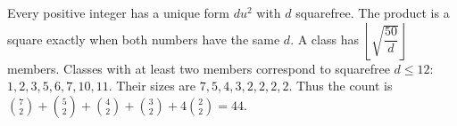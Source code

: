 Every positive integer has a unique form $du^2$ with $d$ squarefree. The product is a square exactly when both numbers have the same $d$. A class has $\left\lfloor\sqrt{\dfrac{50}{d}}\right\rfloor$ members. Classes with at least two members correspond to squarefree $d\le12$: $1,2,3,5,6,7,10,11$. Their sizes are $7,5,4,3,2,2,2,2$. Thus the count is $\binom72+\binom52+\binom42+\binom32+4\binom22=\boxed{44}$.
